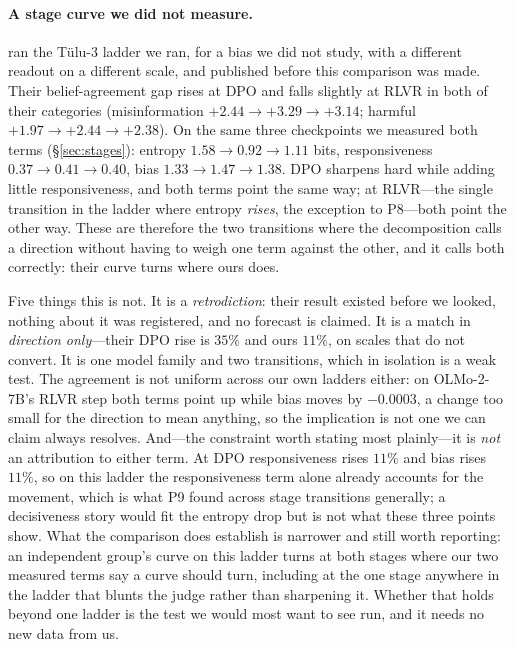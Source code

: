 \documentclass[11pt]{article}
\begin{document}
\paragraph{A stage curve we did not measure.}\label{sec:retro} \citet{zahraei2026prior} ran the
T\"ulu-3 ladder we ran, for a bias we did not study, with a different readout on
a different scale, and published before this comparison was made. Their
belief-agreement gap rises at DPO and falls slightly at RLVR in both of their
categories (misinformation $+2.44 \to +3.29 \to +3.14$; harmful $+1.97 \to +2.44
\to +2.38$). On the same three checkpoints we measured both terms
(\S\ref{sec:stages}): entropy $1.58 \to 0.92 \to 1.11$ bits, responsiveness
$0.37 \to 0.41 \to 0.40$, bias $1.33 \to 1.47 \to 1.38$. DPO sharpens hard while
adding little responsiveness, and both terms point the same way; at RLVR---the
single transition in the ladder where entropy \emph{rises}, the exception to
P8---both point the other way. These are therefore the two transitions where the
decomposition calls a direction without having to weigh one term against the
other, and it calls both correctly: their curve turns where ours does.

Five things this is not. It is a \emph{retrodiction}: their result existed
before we looked, nothing about it was registered, and no forecast is claimed. It
is a match in \emph{direction only}---their DPO rise is $35\%$ and ours $11\%$,
on scales that do not convert. It is one model family and two transitions, which
in isolation is a weak test. The agreement is not uniform across our own ladders
either: on OLMo-2-7B's RLVR step both terms point up while bias moves by
$-0.0003$, a change too small for the direction to mean anything, so the
implication is not one we can claim always resolves. And---the constraint worth
stating most plainly---it is \emph{not} an attribution to either term. At DPO
responsiveness rises $11\%$ and bias rises $11\%$, so on this ladder the
responsiveness term alone already accounts for the movement, which is what P9
found across stage transitions generally; a decisiveness story would fit the
entropy drop but is not what these three points show. What the comparison does
establish is narrower and still worth reporting: an independent group's curve on
this ladder turns at both stages where our two measured terms say a curve should
turn, including at the one stage anywhere in the ladder that blunts the judge
rather than sharpening it. Whether that holds beyond one ladder is the test we
would most want to see run, and it needs no new data from us.
\end{document}
